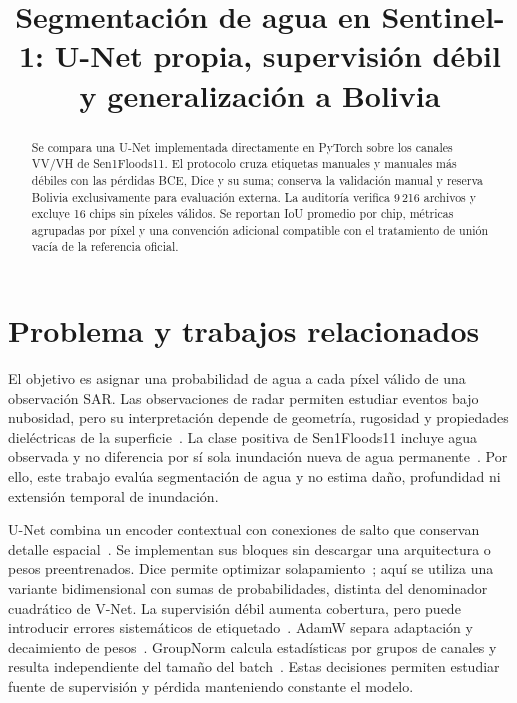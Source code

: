 
\usepackage{float}
\title{Segmentación de agua en Sentinel-1: U-Net propia, supervisión débil y generalización a Bolivia}

\maketitle
\begin{abstract}
Se compara una U-Net implementada directamente en PyTorch sobre los canales VV/VH de
Sen1Floods11. El protocolo cruza etiquetas manuales y manuales más débiles con las pérdidas
BCE, Dice y su suma; conserva la validación manual y reserva Bolivia exclusivamente para
evaluación externa. La auditoría verifica 9\,216 archivos y excluye 16 chips sin píxeles válidos.
Se reportan IoU promedio por chip, métricas agrupadas por píxel y una convención adicional
compatible con el tratamiento de unión vacía de la referencia oficial.
\end{abstract}

\section{Problema y trabajos relacionados}
El objetivo es asignar una probabilidad de agua a cada píxel válido de una observación SAR.
Las observaciones de radar permiten estudiar eventos bajo nubosidad, pero su interpretación
depende de geometría, rugosidad y propiedades dieléctricas de la superficie~\cite{sarhandbook}.
La clase positiva de Sen1Floods11 incluye agua observada y no diferencia por sí sola
inundación nueva de agua permanente~\cite{sen1}. Por ello, este trabajo evalúa segmentación
de agua y no estima daño, profundidad ni extensión temporal de inundación.

U-Net combina un encoder contextual con conexiones de salto que conservan detalle
espacial~\cite{unet}. Se implementan sus bloques sin descargar una arquitectura o pesos
preentrenados. Dice permite optimizar solapamiento~\cite{vnet}; aquí se utiliza una variante
bidimensional con sumas de probabilidades, distinta del denominador cuadrático de V-Net.
La supervisión débil aumenta cobertura, pero puede introducir errores sistemáticos de
etiquetado~\cite{snorkel}. AdamW separa adaptación y decaimiento de pesos~\cite{adamw}.
GroupNorm calcula estadísticas por grupos de canales y resulta independiente del tamaño
del batch~\cite{groupnorm}. Estas decisiones permiten estudiar fuente de supervisión y
pérdida manteniendo constante el modelo.

